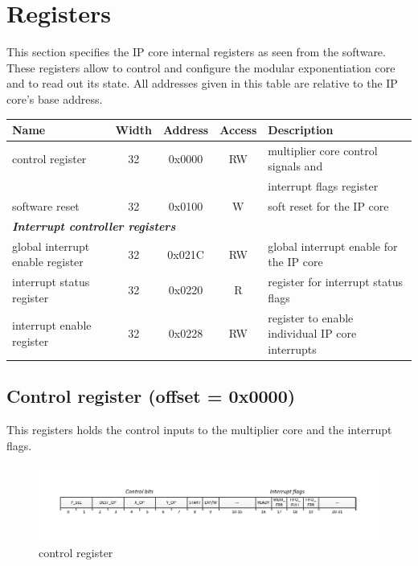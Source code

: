 \section{Registers}
This section specifies the IP core internal registers as seen from the software. These registers allow to control and
configure the modular exponentiation core and to read out its state. All addresses given in this table are relative to the
IP core's base address.\\
\newline
\begin{tabular}{|l|c|c|c|l|}
\hline
\rowcolor{Gray}
\textbf{Name} & \textbf{Width} & \textbf{Address} & \textbf{Access} & \textbf{Description} \bigstrut\\
\hline
control register 		& 32 & 0x0000 & RW 	& multiplier core control signals and \bigstrut[t]\\
						&	&		&		& interrupt flags register\bigstrut[b]\\
\hline
software reset			& 32 & 0x0100 & W 	& soft reset for the IP core  \bigstrut\\
\hline
\multicolumn{5}{|l|}{\textbf{\textit{Interrupt controller registers}}} \bigstrut\\
\hline
global interrupt enable register 	& 32 & 0x021C & RW & global interrupt enable for the IP core \bigstrut[t]\\
interrupt status register			& 32 & 0x0220 &	R  & register for interrupt status flags\\
interrupt enable register			& 32 & 0x0228 & RW & register to enable individual IP core interrupts \bigstrut[b]\\
\hline
\end{tabular}%

\newpage
\subsection{Control register (offset = 0x0000)}
This registers holds the control inputs to the multiplier core and the interrupt flags.\\
\begin{figure}[H]
\centering
\includegraphics[trim=1.2cm 1.2cm 1.2cm 1.2cm, width=15cm]{pictures/plb_control_reg.pdf}
\caption{control register}
\end{figure}


